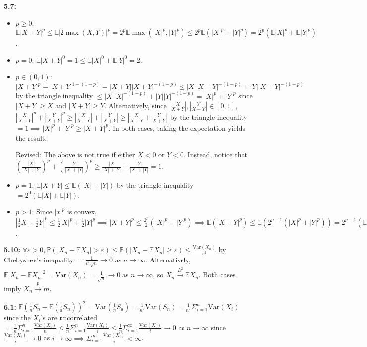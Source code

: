 \documentclass[12pt]{article}
\newcommand{\E}{\mathbb{E}}
\newcommand{\p}{\mathbb{P}}
\newcommand{\V}{\text{Var}}
\begin{document}
\textbf{5.7:}
\begin{itemize}
    \item $p \geq 0$: $\E|X + Y|^p \leq \E|2\max(X,Y)|^p = 2^p \E\max(|X|^p,|Y|^p) \leq 2^p \E(|X|^p + |Y|^p) = 2^p(\E|X|^p + \E|Y|^p)$.
    \item $p = 0$: $\E|X + Y|^0 = 1 \leq \E|X|^0 + \E|Y|^0 = 2$.
    \item $p \in (0,1)$: $|X + Y|^p = |X + Y|^{1-(1-p)} = |X + Y||X + Y|^{-(1-p)} \leq |X||X + Y|^{-(1-p)} + |Y||X + Y|^{-(1-p)}$ by the triangle inequality $\leq |X||X|^{-(1-p)} + |Y||Y|^{-(1-p)} = |X|^p + |Y|^p$ since $|X + Y| \geq X$ and $|X + Y| \geq Y$. Alternatively, since $|\frac{X}{X+Y}|, |\frac{Y}{X+Y}| \in [0,1]$, $|\frac{X}{X+Y}|^p + |\frac{Y}{X+Y}|^p \geq |\frac{X}{X+Y}| + |\frac{Y}{X+Y}| \geq |\frac{X}{X+Y} + \frac{Y}{X+Y}|$ by the triangle inequality $= 1 \implies |X|^p + |Y|^p \geq |X + Y|^p$. In both cases, taking the expectation yields the result.

    Revised: The above is not true if either $X < 0$ or $Y < 0$. Instead, notice that $(\frac{|X|}{|X|+|Y|})^p + (\frac{|Y|}{|X|+|Y|})^p \geq \frac{|X}{|X|+|Y|} + \frac{|Y|}{|X|+|Y|} = 1$.
    \item $p = 1$: $\E|X + Y| \leq \E(|X| + |Y|)$ by the triangle inequality $= 2^0 (\E|X| + \E|Y|)$.
    \item $p > 1$: Since $|x|^p$ is convex, $|\frac{1}{2}X + \frac{1}{2}Y|^p \leq \frac{1}{2}|X|^p + \frac{1}{2}|Y|^p \implies |X + Y|^p \leq \frac{2^p}{2}(|X|^p + |Y|^p) \implies \E(|X + Y|^p) \leq \E(2^{p-1}(|X|^p + |Y|^p)) = 2^{p-1}(\E|X|^p + \E|Y|^p)$.
\end{itemize}

\textbf{5.10:} $\forall \varepsilon > 0, \p(|X_n - \E X_n| > \varepsilon) \leq \p(|X_n - \E X_n| \geq \varepsilon) \leq \frac{\V(X_n)}{\varepsilon^2}$ by Chebyshev's inequality $= \frac{1}{\varepsilon^2 \sqrt{n}} \to 0$ as $n \to \infty$. Alternatively, $\E|X_n - \E X_n|^2 = \V(X_n) = \frac{1}{\sqrt{n}} \to 0$ as $n \to \infty$, so $X_n \overset{L^2}{\to} \E X_n$. Both cases imply $X_n \overset{p}{\to} m$.

\textbf{6.1:} $\E(\frac{1}{n}S_n - \E (\frac{1}{n}S_n))^2 = \V(\frac{1}{n}S_n) = \frac{1}{n^2}\V(S_n) = \frac{1}{n^2}\Sigma_{i=1}^n \V(X_i)$ since the $X_i$'s are uncorrelated $= \frac{1}{n}\Sigma_{i=1}^n \frac{\V(X_i)}{n} \leq \frac{1}{n}\Sigma_{i=1}^n \frac{\V(X_i)}{i} \leq \frac{1}{n}\Sigma_{i=1}^\infty \frac{\V(X_i)}{i} \to 0$ as $n \to \infty$ since $\frac{\V(X_i)}{i} \to 0$ as $i \to \infty \implies \Sigma_{i=1}^\infty \frac{\V(X_i)}{i} < \infty$.
\end{document}
